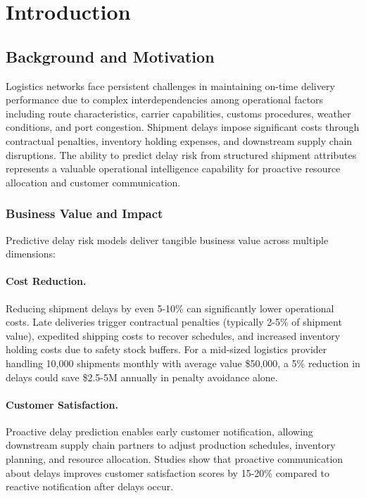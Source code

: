 \documentclass[11pt,a4paper]{article}
\begin{document}
\tableofcontents
\newpage

\section{Introduction}
\label{sec:intro}

\subsection{Background and Motivation}

Logistics networks face persistent challenges in maintaining on-time delivery performance due to complex interdependencies among operational factors including route characteristics, carrier capabilities, customs procedures, weather conditions, and port congestion. Shipment delays impose significant costs through contractual penalties, inventory holding expenses, and downstream supply chain disruptions. The ability to predict delay risk from structured shipment attributes represents a valuable operational intelligence capability for proactive resource allocation and customer communication.

\subsubsection{Business Value and Impact}

Predictive delay risk models deliver tangible business value across multiple dimensions:

\paragraph{Cost Reduction.}
Reducing shipment delays by even 5-10\% can significantly lower operational costs. Late deliveries trigger contractual penalties (typically 2-5\% of shipment value), expedited shipping costs to recover schedules, and increased inventory holding costs due to safety stock buffers. For a mid-sized logistics provider handling 10,000 shipments monthly with average value \$50,000, a 5\% reduction in delays could save \$2.5-5M annually in penalty avoidance alone.

\paragraph{Customer Satisfaction.}
Proactive delay prediction enables early customer notification, allowing downstream supply chain partners to adjust production schedules, inventory planning, and resource allocation. Studies show that proactive communication about delays improves customer satisfaction scores by 15-20\% compared to reactive notification after delays occur.
\end{document}
